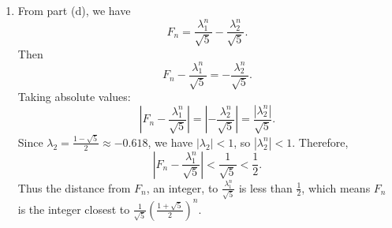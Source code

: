 \documentclass[11pt]{article}
\begin{document}
\begin{solutionBox}
\begin{enumerate}
    \item[(e)] 
    From part (d), we have
    \[F_n = \frac{\lambda_1^n}{\sqrt{5}} - \frac{\lambda_2^n}{\sqrt{5}}.\]
    Then
    \[F_n - \frac{\lambda_1^n}{\sqrt{5}} = -\frac{\lambda_2^n}{\sqrt{5}}.\]
    Taking absolute values:
    \[\left|F_n - \frac{\lambda_1^n}{\sqrt{5}}\right| = \left|-\frac{\lambda_2^n}{\sqrt{5}}\right| = \frac{|\lambda_2^n|}{\sqrt{5}}.\]
    Since \(\lambda_2 = \frac{1 - \sqrt{5}}{2} \approx -0.618\), we have \(|\lambda_2| < 1\), so \(|\lambda_2^n| < 1\). Therefore,
    \[\left|F_n - \frac{\lambda_1^n}{\sqrt{5}}\right| < \frac{1}{\sqrt{5}} < \frac{1}{2}.\]
    Thus the distance from \(F_n\), an integer, to \(\frac{\lambda_1^n}{\sqrt{5}}\) is less than \(\frac{1}{2}\), which means \(F_n\) is the integer closest to \(\frac{1}{\sqrt{5}}\left(\frac{1+\sqrt{5}}{2}\right)^n\).
\end{enumerate}

\end{solutionBox}
\end{document}
